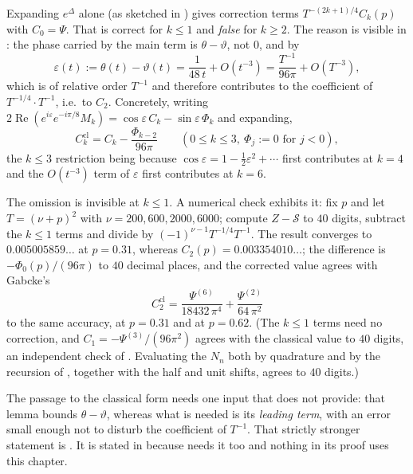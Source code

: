 \begin{remark}[The $\theta$ trap: the model expansion alone is wrong from $k=2$ on]
\label{rem:rsg_theta_trap}
Expanding $e^{\Delta}$ alone (as sketched in ) gives correction terms
$T^{-(2k+1)/4}C_{k}(p)$ with $C_{0}=\Psi$.  That is correct for $k\le1$ and
\emph{false} for $k\ge2$.  The reason is visible in : the phase carried by
the main term is $\theta-\vartheta$, not $0$, and by 
\[
  \varepsilon(t):=\theta(t)-\vartheta(t)=\frac1{48\,t}+O(t^{-3})=\frac{T^{-1}}{96\pi}+O(T^{-3}),
\]
which is of relative order $T^{-1}$ and therefore contributes to the coefficient of
$T^{-1/4}\cdot T^{-1}$, i.e.\ to $C_{2}$.  Concretely, writing
$2\operatorname{Re}(e^{i\varepsilon}e^{-i\pi/8}M_{k})=\cos\varepsilon\,C_{k}
-\sin\varepsilon\,\Phi_{k}$ and expanding,
\[
  C_{k}^{\mathrm{cl}}=C_{k}-\frac{\Phi_{k-2}}{96\pi}\qquad(0\le k\le3,\ \Phi_{j}:=0\text{ for }j<0),
\]
the $k\le3$ restriction being because $\cos\varepsilon=1-\tfrac12\varepsilon^{2}+\cdots$ first
contributes at $k=4$ and the $O(t^{-3})$ term of $\varepsilon$ first contributes at $k=6$.

The omission is invisible at $k\le1$.  A numerical check exhibits it: fix $p$ and let $T=(\nu+p)^{2}$ with
$\nu=200,600,2000,6000$; compute $Z-\mathcal{S}$ to $40$ digits, subtract the $k\le1$ terms and
divide by $(-1)^{\nu-1}T^{-1/4}T^{-1}$.  The result converges to $0.005005859\ldots$ at
$p=0.31$, whereas $C_{2}(p)=0.003354010\ldots$; the difference is
$-\Phi_{0}(p)/(96\pi)$ to $40$ decimal places, and the corrected value agrees with Gabcke's \cite{Gabcke}
\[
  C_{2}^{\mathrm{cl}}=\frac{\Psi^{(6)}}{18432\,\pi^{4}}+\frac{\Psi^{(2)}}{64\,\pi^{2}}
\]
to the same accuracy, at $p=0.31$ and at $p=0.62$.  (The $k\le1$ terms need no correction, and
$C_{1}=-\Psi^{(3)}/(96\pi^{2})$ agrees with the classical value to $40$ digits, an independent
check of .  Evaluating the $N_{n}$ both by quadrature and by the
recursion of , together with the half and unit shifts, agrees to $40$
digits.)
\end{remark}

The passage to the classical form needs one input that  does not provide:
that lemma bounds $\theta-\vartheta$, whereas what is needed is its \emph{leading term}, with an
error small enough not to disturb the coefficient of $T^{-1}$.  That strictly stronger statement
is .  It is stated in  because
 needs it too and nothing in its proof uses this chapter.

